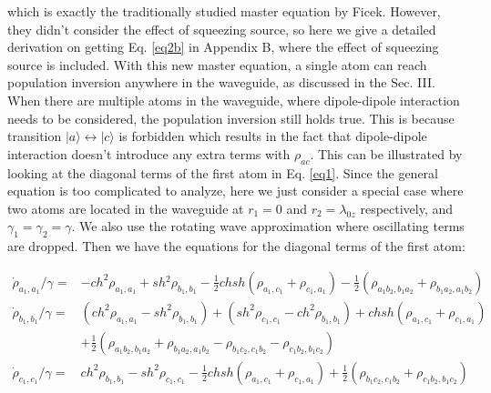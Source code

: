 \documentclass[aps,showpacs,twocolumn,twoside,groupedaddress]{revtex4}
\begin{document}
which is exactly the traditionally studied master equation\cite{tanas2004stationary} by Ficek. However, they didn't consider the effect of squeezing source, so here we give a detailed derivation on getting Eq. \eqref{eq2b} in Appendix B, where the effect of squeezing source is included. With this new master equation, a single atom can reach population inversion anywhere in the waveguide, as discussed in the Sec. III. When there are multiple atoms in the waveguide, where dipole-dipole interaction needs to be considered, the population inversion still holds true. This is because transition $|a\rangle\leftrightarrow|c\rangle$ is forbidden which results in the fact that dipole-dipole interaction doesn't introduce any extra terms with $\rho_{ac}$. This can be illustrated by looking at the diagonal terms of the first atom in Eq. \eqref{eq1}. Since the general equation is too complicated to analyze, here we just consider a special case where two atoms are located in the waveguide at $r_1=0$ and $r_2=\lambda_{0z}$ respectively, and $\gamma_1=\gamma_2=\gamma$. We also use the rotating wave approximation where oscillating terms are dropped. Then we have the equations for the diagonal terms of the first atom:
\begin{widetext}
\begin{subequations}
\begin{align}
\dot{\rho}_{a_{1},a_{1}}/\gamma=&-ch^{2}\rho_{a_{1},a_{1}}+sh{}^{2}\rho_{b_{1},b_{1}}-\frac{1}{2}chsh(\rho_{a_{1},c_{1}}+\rho_{c_{1},a_{1}})-\frac{1}{2}(\rho_{a_{1}b_{2},b_{1}a_{2}}+\rho_{b_{1}a_{2},a_{1}b_{2}})\label{5a} \\
\dot{\rho}_{b_{1},b_{1}}/\gamma=&(ch^{2}\rho_{a_{1},a_{1}}-sh^{2}\rho_{b_{1},b_{1}})+(sh^{2}\rho_{c_{1},c_{1}}-ch^{2}\rho_{b_{1},b_{1}})+chsh(\rho_{a_{1},c_{1}}+\rho_{c_{1},a_{1}})\nonumber\\
&+\frac{1}{2}(\rho_{a_{1}b_{2},b_{1}a_{2}}+\rho_{b_{1}a_{2},a_{1}b_{2}}-\rho_{b_{1}c_{2},c_{1}b_{2}}-\rho_{c_{1}b_{2},b_{1}c_{2}}) \label{5b}\\
\dot{\rho}_{c_{1},c_{1}}/\gamma=&ch^{2}\rho_{b_{1},b_{1}}-sh^{2}\rho_{c_{1},c_{1}}-\frac{1}{2}chsh(\rho_{a_{1},c_{1}}+\rho_{c_{1},a_{1}})+\frac{1}{2}(\rho_{b_{1}c_{2},c_{1}b_{2}}+\rho_{c_{1}b_{2},b_{1}c_{2}}) \label{5c}
\end{align}
\end{subequations}
\end{widetext}
\end{document}
